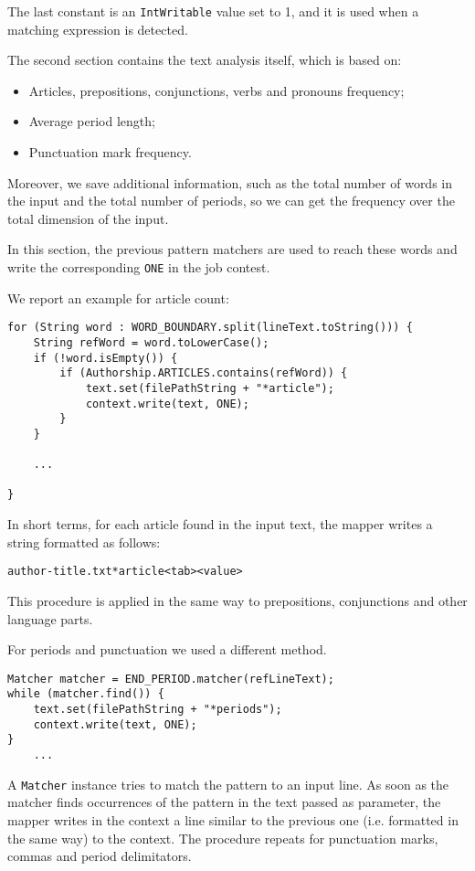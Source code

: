 \documentclass[a4paper,11pt, twoside]{article}
\begin{document}
	\noindent
	The last constant is an \lstinline|IntWritable| value set to 1, and it is used when a matching expression is detected.

	\noindent
	The second section contains the text analysis itself, which is based on: \begin{itemize}
		\item Articles, prepositions, conjunctions, verbs and pronouns frequency;
		\item Average period length;
		\item Punctuation mark frequency.
	\end{itemize}
	Moreover, we save additional information, such as the total number of words in the input and the total number of periods, so we can get the frequency over the total dimension of the input.

	\noindent
	In this section, the previous pattern matchers are used to reach these words and write the corresponding \lstinline|ONE| in the job contest. 
	
	\noindent
	We report an example for article count: \begin{lstlisting}[firstnumber=85, caption={Articles counting in Map method}, captionpos=b]
for (String word : WORD_BOUNDARY.split(lineText.toString())) {
	String refWord = word.toLowerCase();
	if (!word.isEmpty()) {
		if (Authorship.ARTICLES.contains(refWord)) {
			text.set(filePathString + "*article");
			context.write(text, ONE);
		}
	}

	...

}
	\end{lstlisting}
	\noindent
	In short terms, for each article found in the input text, the mapper writes a string formatted as follows:\begin{center}
		\texttt{author-title.txt*article<tab><value>} 
	\end{center}

	This procedure is applied in the same way to prepositions, conjunctions and other language parts.
	
	\bigskip
	\noindent
	For periods and punctuation we used a different method.
	\begin{lstlisting}[firstnumber=109, caption={Period counting in Map method}, captionpos=b]
Matcher matcher = END_PERIOD.matcher(refLineText);
while (matcher.find()) {
	text.set(filePathString + "*periods");
	context.write(text, ONE);
}
	...
	\end{lstlisting}
	
	\noindent
	A \lstinline|Matcher| instance tries to match the pattern to an input line. As soon as the matcher finds occurrences of the pattern in the text passed as parameter, the mapper writes in the context a line similar to the previous one (i.e. formatted in the same way) to the context. The procedure repeats for punctuation marks, commas and period delimitators. 
	
\end{document}
